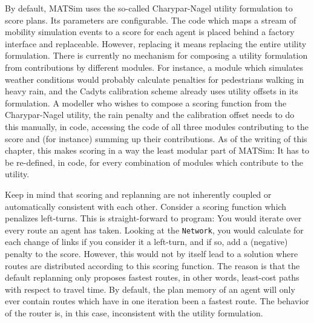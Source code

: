 By default, MATSim uses the so-called Charypar-Nagel utility formulation to score plans. Its parameters
are configurable.
The code which maps a stream of mobility simulation events to a score for each agent is placed behind a factory
 interface and replaceable. However, replacing it means replacing the entire utility formulation. There is
 currently no mechanism for composing a utility formulation from contributions by different modules.
For instance, a module which simulates weather conditions would probably calculate penalties for pedestrians
  walking in heavy rain, and the Cadyts calibration scheme already uses utility offsets in its formulation. A modeller
  who wishes to compose a scoring function from the Charypar-Nagel utility, the rain penalty and the calibration offset
  needs to do this manually, in code, accessing the code of all three modules contributing to the score and (for instance) summing
  up their contributions. As of the writing of this chapter, this makes scoring in a way the least modular part of MATSim: It has to 
be re-defined, in code, for every combination of modules which contribute to the utility.

Keep in mind that scoring and replanning are not inherently coupled or automatically consistent with each other. 
Consider a scoring function which penalizes left-turns. This is straight-forward to program: You would 
iterate over every route an agent has taken. Looking at the \lstinline$Network$, you would calculate for each change of
links if you consider it a left-turn, and if so, add a (negative) penalty to the score. However, this would not by itself lead to a
solution where routes are distributed according to this scoring function. The reason is that the default replanning only proposes
 fastest routes, in other words, least-cost paths with respect to travel time. By default, the plan memory of an agent will only ever
 contain routes which have in one iteration been a fastest route. The behavior of the router is, in this case, inconsistent with the utility
 formulation.
   


